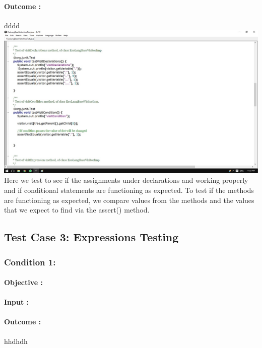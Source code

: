 \documentclass[english]{article}
\begin{document}
			\paragraph{Outcome :} dddd\\
			\includegraphics[width=\linewidth]{test2.jpg}
			\\[12pt]	
			Here we test to see if the assignments under declarations and working properly and if conditional statements are functioning as expected.
			To test if the methods are functioning as expected, we compare values from the methods and the values that	we expect to find via the assert() method.	
			\subsection{Test Case 3: Expressions Testing}
			\subsubsection{Condition 1: }
			\paragraph{Objective :}
			\paragraph{Input :}
			\paragraph{Outcome :}hhdhdh \\
				
\end{document}
